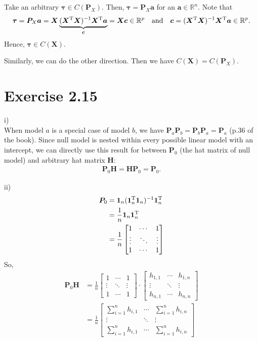 \documentclass[a4paper]{article}
\begin{document}
Take an arbitrary $\bm{\tau} \in C(\bm{P}_{X})$. Then, $\bm{\tau} = \bm{P}_{X}\bm{a}$ for an $\bm{a} \in \mathbb{R}^{n}$.
Note that
\begin{align*}
\bm{\tau} = \bm{P}_{X}\bm{a} =  \bm{X}\underbrace{(\bm{X}^{\rm T}\bm{X})^{-1}\bm{X}^{\rm T}\bm{a}}_{\bm{c}} = \bm{X}\bm{c} \in \mathbb{R}^{p} \quad \mbox{and} \quad \bm{c} = (\bm{X}^{\rm T}\bm{X})^{-1}\bm{X}^{\rm T}\bm{a} \in \mathbb{R}^{p}.
\end{align*}
Hence, $\bm{\tau} \in C(\bm{X})$.

Similarly, we can do the other direction. Then we have $C(\bm{X}) = C(\bm{P}_{X})$.


\vspace{\baselineskip}
\section{Exercise 2.15}
i)\\
When model $a$ is a special case of model $b$, we have $\bm{P}_{a}\bm{P}_{b} = \bm{P}_{b}\bm{P}_{a} = \bm{P}_{a}$ (p.36 of the book). Since null model is nested within every possible linear model with an intercept, we can directly use this result for between $\bm{P}_{0}$ (the hat matrix of null model) and arbitrary hat matrix $\bm{H}$:
\begin{align*}
\bm{P}_{0}\bm{H} = \bm{H}\bm{P}_{0} = \bm{P}_{0}.
\end{align*}

ii)\\
\begin{align*}
\bm{P}_{0} &= \bm{1}_{n}(\bm{1}_{n}^{\rm T}\bm{1}_{n})^{-1}\bm{1}_{n}^{\rm T}\\
&= \frac{1}{n}\bm{1}_{n}\bm{1}_{n}^{\rm T}\\
&= 
\frac{1}{n}
\begin{bmatrix}
1 & \cdots & 1\\
\vdots & \ddots & \vdots\\
1 & \cdots & 1
\end{bmatrix}
\end{align*}
So, 
\begin{align*}
\bm{P}_{0}\bm{H}
&= 
\frac{1}{n}
\begin{bmatrix}
1 & \cdots & 1\\
\vdots & \ddots & \vdots\\
1 & \cdots & 1
\end{bmatrix}
\cdot
\begin{bmatrix}
h_{1,1} & \cdots & h_{1,n}\\
\vdots & \ddots & \vdots\\
h_{n,1} & \cdots & h_{n,n}
\end{bmatrix}
\\
&= 
\frac{1}{n}
\begin{bmatrix}
\sum_{i=1}^{n} h_{i,1} & \cdots & \sum_{i=1}^{n} h_{i,n}\\
\vdots & \ddots & \vdots\\
\sum_{i=1}^{n} h_{i,1} & \cdots & \sum_{i=1}^{n} h_{i,n}
\end{bmatrix}
\end{align*}
\end{document}
